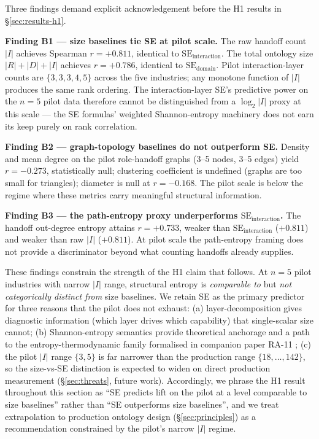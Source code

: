 \documentclass[11pt,a4paper]{article}
\newcommand{\se}{\mathrm{SE}}
\newcommand{\sedom}{\se_{\text{domain}}}
\newcommand{\seint}{\se_{\text{interaction}}}
\begin{document}
Three findings demand explicit acknowledgement before the H1 results
in \S\ref{sec:results-h1}.

\textbf{Finding B1 --- size baselines tie SE at pilot scale.} The raw
handoff count $|I|$ achieves Spearman $r = +0.811$, identical to
$\seint$. The total ontology size $|R|+|D|+|I|$ achieves $r = +0.786$,
identical to $\sedom$. Pilot interaction-layer counts are
$\{3, 3, 3, 4, 5\}$ across the five industries; any monotone function
of $|I|$ produces the same rank ordering. The interaction-layer SE's
predictive power on the $n=5$ pilot data therefore cannot be
distinguished from a $\log_2|I|$ proxy at this scale --- the SE
formulas' weighted Shannon-entropy machinery does not earn its keep
purely on rank correlation.

\textbf{Finding B2 --- graph-topology baselines do not outperform SE.}
Density and mean degree on the pilot role-handoff graphs (3--5 nodes,
3--5 edges) yield $r = -0.273$, statistically null; clustering
coefficient is undefined (graphs are too small for triangles);
diameter is null at $r = -0.168$. The pilot scale is below the regime
where these metrics carry meaningful structural information.

\textbf{Finding B3 --- the path-entropy proxy underperforms $\seint$.}
The handoff out-degree entropy attains $r = +0.733$, weaker than
$\seint$ ($+0.811$) and weaker than raw $|I|$ ($+0.811$). At pilot
scale the path-entropy framing does not provide a discriminator
beyond what counting handoffs already supplies.

These findings constrain the strength of the H1 claim that follows.
At $n=5$ pilot industries with narrow $|I|$ range, structural entropy
is \emph{comparable to} but \emph{not categorically distinct from}
size baselines. We retain SE as the primary predictor for three
reasons that the pilot does not exhaust: (a) layer-decomposition
gives diagnostic information (which layer drives which capability)
that single-scalar size cannot; (b) Shannon-entropy semantics provide
theoretical anchorage and a path to the entropy-thermodynamic family
formalised in companion paper RA-11
\citep{luong2026quantum}; (c) the pilot $|I|$ range $\{3,5\}$ is far
narrower than the production range $\{18, \ldots, 142\}$, so the
size-vs-SE distinction is expected to widen on direct production
measurement (\S\ref{sec:threats}, future work). Accordingly, we phrase
the H1 result throughout this section as ``SE predicts lift on the
pilot at a level comparable to size baselines'' rather than ``SE
outperforms size baselines'', and we treat extrapolation to production
ontology design (\S\ref{sec:principles}) as a recommendation
constrained by the pilot's narrow $|I|$ regime.
\end{document}
